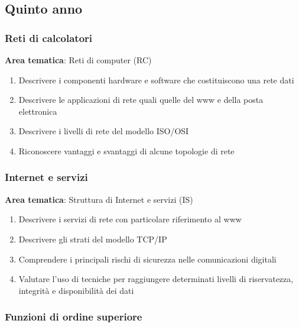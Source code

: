 \subsection{Quinto anno}
\label{sec:quinto-anno}

\subsubsection[Reti]{Reti di calcolatori}
\label{sec:reti}

\noindent\textbf{Area tematica}: Reti di computer (RC)

    
\begin{enumerate}
  \item Descrivere i componenti hardware e software che costituiscono una rete dati
  \item Descrivere le applicazioni di rete quali quelle del www e della posta elettronica
  \item Descrivere i livelli di rete del modello ISO/OSI
  \item Riconoscere vantaggi e svantaggi di alcune topologie di rete
\end{enumerate}

\subsubsection[Internet]{Internet e servizi}
\label{sec:internet}

\noindent\textbf{Area tematica}: Struttura di Internet e servizi (IS)

    
\begin{enumerate}
  \item Descrivere i servizi di rete con particolare riferimento al www
  \item Descrivere gli strati del modello TCP/IP
  \item Comprendere i principali rischi di sicurezza nelle comunicazioni digitali
  \item Valutare l'uso di tecniche per raggiungere determinati livelli di riservatezza, integrità e disponibilità dei dati
\end{enumerate}

\subsubsection[Funzioni di ordine superiore]{Funzioni di ordine superiore}
\label{sec:funzioni-di ordine superiore}

